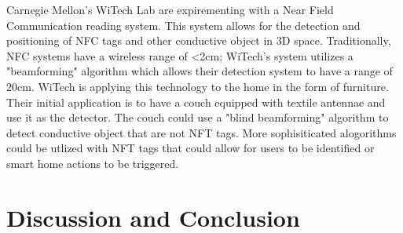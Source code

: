 \documentclass{article}
\begin{document}
Carnegie Mellon's WiTech Lab are expirementing with a Near Field Communication reading system.
This system allows for the detection and positioning of NFC tags and other conductive object in 3D space.
Traditionally, NFC systems have a wireless range of <2cm; WiTech's system utilizes a "beamforming" algorithm
which allows their detection system to have a range of 20cm. WiTech is applying this 
technology to the home in the form of furniture. Their initial application is to have a couch equipped with textile 
antennae and use it as the detector. 
The couch could use a "blind beamforming" algorithm to detect conductive object that are 
not NFT tags. More sophisiticated alogorithms could be utlized with NFT tags that could
allow for users to be identified or smart home actions to be triggered. 


 




\section*{Discussion and Conclusion}
\end{document}
